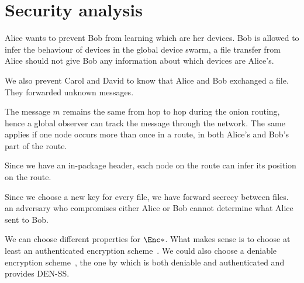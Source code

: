 \section{Security analysis}%
\label{SecurityAnalysis}


Alice wants to prevent Bob from learning which are her devices. Bob is allowed 
to infer the behaviour of devices in the global device swarm, a file transfer 
from Alice should not give Bob any information about which devices are Alice's.

We also prevent Carol and David to know that Alice and Bob exchanged a file. 
They forwarded unknown messages.

The message \(m\) remains the same from hop to hop during the onion routing, 
hence a global observer can track the message through the network.
The same applies if one node occurs more than once in a route, \eg in both 
Alice's and Bob's part of the route.

Since we have an in-package header, each node on the route can infer its 
position on the route.

Since we choose a new key for every file, we have forward secrecy between files.
\Eg an adversary who compromises either Alice or Bob cannot determine what Alice 
sent to Bob.

We can choose different properties for \(\Enc*\).
What makes sense is to choose at least an authenticated encryption 
scheme~\cite{AuthEncryption}.
We could also choose a deniable encryption scheme~\cite{DeniableEncryption}, \eg 
the one by \textcite{OTPKX} which is both deniable and authenticated and 
provides \ac{DEN-SS}.
